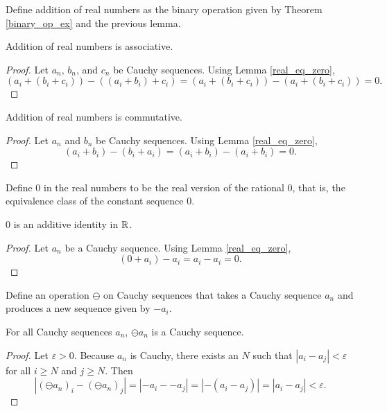 \documentclass[../../math.tex]{subfiles}
\begin{document}
\begin{instance}
    Define addition of real numbers as the binary operation given by Theorem
    \ref{binary_op_ex} and the previous lemma.
\end{instance}

\begin{instance}
    Addition of real numbers is associative.
\end{instance}
\begin{proof}
    Let $a_n$, $b_n$, and $c_n$ be Cauchy sequences.  Using Lemma
    \ref{real_eq_zero},
    \[
        (a_i + (b_i + c_i)) - ((a_i + b_i) + c_i)
        = (a_i + (b_i + c_i)) - (a_i + (b_i + c_i))
        = 0.
    \]
\end{proof}

\begin{instance}
    Addition of real numbers is commutative.
\end{instance}
\begin{proof}
    Let $a_n$ and $b_n$ be Cauchy sequences.  Using Lemma \ref{real_eq_zero},
    \[
        (a_i + b_i) - (b_i + a_i)
        = (a_i + b_i) - (a_i + b_i)
        = 0.
    \]
\end{proof}

\begin{instance}
    Define $0$ in the real numbers to be the real version of the rational $0$,
    that is, the equivalence class of the constant sequence $0$.
\end{instance}

\begin{instance}
    $0$ is an additive identity in $\mathbb{R}$.
\end{instance}
\begin{proof}
    Let $a_n$ be a Cauchy sequence.  Using Lemma \ref{real_eq_zero},
    \[
        (0 + a_i) - a_i
        = a_i - a_i
        = 0.
    \]
\end{proof}

\begin{definition}
    Define an operation $\ominus$ on Cauchy sequences that takes a Cauchy
    sequence $a_n$ and produces a new sequence given by $-a_i$.
\end{definition}

\begin{lemma}
    For all Cauchy sequences $a_n$, $\ominus a_n$ is a Cauchy sequence.
\end{lemma}
\begin{proof}
    Let $\varepsilon > 0$.  Because $a_n$ is Cauchy, there exists an $N$ such
    that $|a_i - a_j| < \varepsilon$ for all $i \geq N$ and $j \geq N$.  Then
    \[
        |(\ominus a_n)_i - (\ominus a_n)_j|
        = |{-}a_i - -a_j|
        = |{-}(a_i - a_j)|
        = |a_i - a_j|
        < \varepsilon.
    \]
\end{proof}
\end{document}
